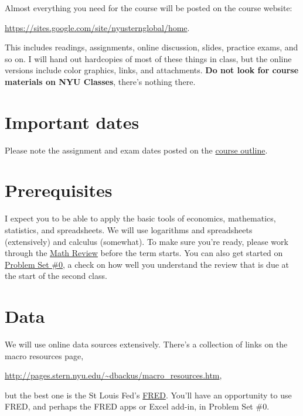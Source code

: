 \documentclass[12pt]{article}
\begin{document}
Almost everything you need for the course will be posted on the course website:

\vspace*{\parskip}
\centerline{\url{https://sites.google.com/site/nyusternglobal/home}.}

This includes readings, assignments, online discussion,
slides, practice exams, and so on.
I will hand out hardcopies of most of these things in class,
but the online versions include color graphics, links, and attachments.
{\bf Do not look for course materials on NYU Classes},
there's nothing there.

\section{Important dates}

Please note the assignment and exam dates posted on the
\href{https://sites.google.com/site/nyusternglobal/home/outline}{course outline}.


\section{Prerequisites}

I expect you to be able to apply the basic tools of economics,
mathematics, statistics, and spreadsheets.  We will use
logarithms and spreadsheets (extensively) and calculus (somewhat).
To make sure you're ready,
please work through the
\href{http://www.stern.nyu.edu/~dbackus/2303/notes_math.pdf}{Math Review}
before the term starts.
You can also get started on
\href{http://www.stern.nyu.edu/~dbackus/2303/ps0_f14.pdf}{Problem Set \#0}, %
a check on how well you understand the review
that is due at the start of the second class.

\section{Data}

We will use online data sources extensively.
There's a collection of links on the macro resources page,

\vspace*{\parskip}
\centerline{\url{http://pages.stern.nyu.edu/~dbackus/macro_resources.htm},}

but the best one is the St Louis Fed's
\href{http://research.stlouisfed.org/fred2/}{FRED}.
You'll have an opportunity to use FRED, and perhaps the FRED apps or Excel add-in,
in Problem Set \#0.
\end{document}
